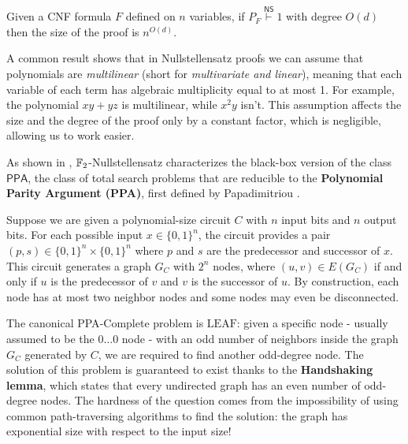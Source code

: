 \begin{proposition}
    \label{degree_size}
 Given a CNF formula $F$ defined on $n$ variables, if $P_F \stackrel{\mathsf{NS}}{\vdash} 1$ with degree $O(d)$ then the size of the proof is $n^{O(d)}$.
\end{proposition}

A common result shows that in Nullstellensatz proofs we can assume that polynomials are \textit{multilinear} (short for \textit{multivariate and linear}), meaning that each variable of each term has algebraic multiplicity equal to at most 1. For example, the polynomial $xy+yz$ is multilinear, while $x^2y$ isn't. This assumption affects the size and the degree of the proof only by a constant factor, which is negligible, allowing us to work easier.

As shown in , $\mathbb{F}_2$-Nullstellensatz characterizes the black-box version of the class $\mathsf{PPA}$, the class of total search problems that are reducible to the \textbf{Polynomial Parity Argument (PPA)}, first defined by Papadimitriou \cite{PPA_complexity}.

Suppose we are given a polynomial-size circuit $C$ with $n$ input bits and $n$ output bits. For each possible input $x \in \{0,1\}^n$, the circuit provides a pair $(p,s) \in \{0,1\}^n \times \{0,1\}^n$ where $p$ and $s$ are the predecessor and successor of $x$. This circuit generates a graph $G_C$ with $2^n$ nodes, where $(u,v) \in E(G_C)$ if and only if $u$ is the predecessor of $v$ and $v$ is the successor of $u$. By construction, each node has at most two neighbor nodes and some nodes may even be disconnected.

The canonical \textsf{PPA}-Complete problem is $\mathrm{LEAF}$: given a specific node - usually assumed to be the $0 \ldots 0$ node - with an odd number of neighbors inside the graph $G_C$ generated by $C$, we are required to find another odd-degree node. The solution of this problem is guaranteed to exist thanks to the \textbf{Handshaking lemma}, which states that every undirected graph has an even number of odd-degree nodes. The hardness of the question comes from the impossibility of using common path-traversing algorithms to find the solution: the graph has exponential size with respect to the input size!

